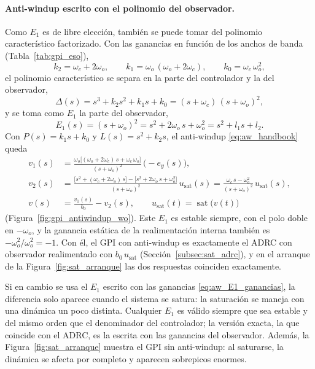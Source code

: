 \paragraph{Anti-windup escrito con el polinomio del observador.} Como $E_1$ es de libre
elección, también se puede tomar del polinomio característico factorizado. Con las ganancias en
función de los anchos de banda (Tabla~\ref{tab:gpi_eso}),
\begin{equation}
k_2 = \omega_c + 2\omega_o, \qquad k_1 = \omega_o\,(\omega_o + 2\omega_c), \qquad k_0 = \omega_c\,\omega_o^2,
\end{equation}
el polinomio característico se separa en la parte del controlador y la del observador,
\begin{equation}
\Delta(s) = s^3 + k_2 s^2 + k_1 s + k_0 = (s + \omega_c)\,(s + \omega_o)^2 ,
\end{equation}
y se toma como $E_1$ la parte del observador,
\begin{equation}
E_1(s) = (s + \omega_o)^2 = s^2 + 2\omega_o\,s + \omega_o^2 = s^2 + l_1 s + l_2 .
\end{equation}
Con $P(s) = k_1 s + k_0$ y $L(s) = s^2 + k_2 s$, el anti-windup \eqref{eq:aw_handbook} queda
\begin{align}
v_1(s) &= \frac{\omega_o\bigl[(\omega_o + 2\omega_c)\,s + \omega_c\,\omega_o\bigr]}{(s + \omega_o)^2}\,\bigl(-e_y(s)\bigr), \nonumber\\[4pt]
v_2(s) &= \frac{\bigl[s^2 + (\omega_c + 2\omega_o)\,s\bigr] - \bigl[s^2 + 2\omega_o\,s + \omega_o^2\bigr]}{(s + \omega_o)^2}\,u_{\mathrm{sat}}(s)
= \frac{\omega_c\,s - \omega_o^2}{(s + \omega_o)^2}\,u_{\mathrm{sat}}(s), \nonumber\\[4pt]
v(s) &= \frac{v_1(s)}{b_0} - v_2(s), \qquad u_{\mathrm{sat}}(t) = \operatorname{sat}\bigl(v(t)\bigr)
\label{eq:aw_gpi_wo}
\end{align}
(Figura~\ref{fig:gpi_antiwindup_wo}). Este $E_1$ es estable siempre, con el polo
doble en $-\omega_o$, y la ganancia estática de la realimentación interna también
es $-\omega_o^2/\omega_o^2 = -1$. Con él, el GPI con anti-windup es exactamente el
ADRC con observador realimentado con $b_0\,u_{\mathrm{sat}}$
(Sección~\ref{subsec:sat_adrc}), y en el arranque de la
Figura~\ref{fig:sat_arranque} las dos respuestas coinciden exactamente.

Si en cambio se usa el $E_1$ escrito con las ganancias \eqref{eq:aw_E1_ganancias},
la diferencia solo aparece cuando el sistema se satura: la saturación se maneja con
una dinámica un poco distinta. Cualquier $E_1$ es válido siempre que sea estable y
del mismo orden que el denominador del controlador; la versión exacta, la que
coincide con el ADRC, es la escrita con las ganancias del observador. Además, la
Figura~\ref{fig:sat_arranque} muestra el GPI sin anti-windup: al saturarse, la
dinámica se afecta por completo y aparecen sobrepicos enormes. 


